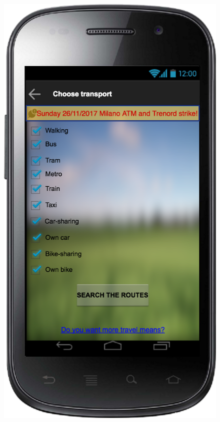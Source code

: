 \documentclass[a4paper,leqno]{article}
\begin{document}
\begin{figure}
	\hspace{0.5cm}
	\begin{minipage}[!h]{0.45\linewidth}
		\centering
		\includegraphics[scale = 0.15]{chooseTransport.png}
	\end{minipage}
	

\end{figure}
\end{document}
